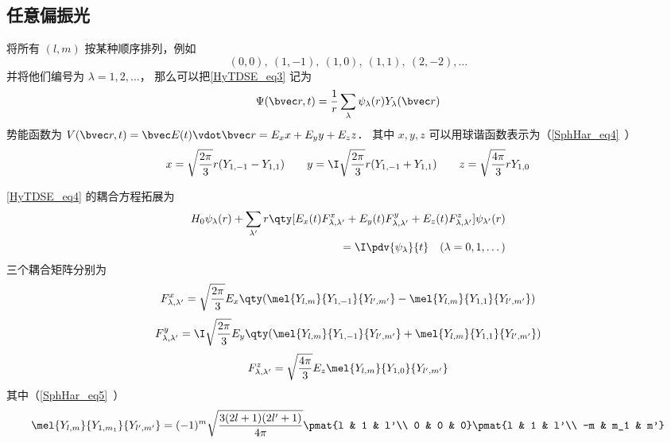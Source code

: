 \subsection{任意偏振光}
将所有 $(l,m)$ 按某种顺序排列，例如
\begin{equation}
(0, 0),\ (1,-1),\ (1,0),\ (1,1),\ (2,-2), \dots
\end{equation}
并将他们编号为 $\lambda = 1,2, \dots$， 那么可以把\autoref{HyTDSE_eq3} 记为
\begin{equation}
\Psi(\bvec r, t) = \frac{1}{r}\sum_\lambda \psi_\lambda(r) Y_\lambda(\bvec r)
\end{equation}
势能函数为 $V(\bvec r, t) = \bvec E(t) \vdot \bvec r  = E_x x + E_y y + E_z z$． 其中 $x,y,z$ 可以用球谐函数表示为（\autoref{SphHar_eq4}~）
\begin{equation}
x = \sqrt{\frac{2\pi}{3}} r (Y_{1,-1} - Y_{1,1}) \qquad
y = \I \sqrt{\frac{2\pi}{3}} r (Y_{1,-1}+Y_{1,1}) \qquad
z = \sqrt{\frac{4\pi}{3}} rY_{1,0}
\end{equation}

\autoref{HyTDSE_eq4} 的耦合方程拓展为
\begin{equation}
\begin{aligned}
H_0 \psi_{\lambda}(r) + \sum_{\lambda'} r \qty[E_x(t) F_{\lambda, \lambda'}^{x} + E_y(t) F_{\lambda, \lambda'}^{y} + E_z(t) F_{\lambda, \lambda'}^{z}] \psi_{\lambda'}(r) \\
= \I \pdv{\psi_{\lambda}}{t} \quad (\lambda=0,1,\dots)
\end{aligned}
\end{equation}
三个耦合矩阵分别为
\begin{equation}
\begin{aligned}
F_{\lambda,\lambda'}^{x} = \sqrt{\frac{2\pi}{3}} E_x \qty(\mel{Y_{l,m}}{Y_{1,-1}}{Y_{l',m'}} - \mel{Y_{l,m}}{Y_{1,1}}{Y_{l',m'}})
\end{aligned}
\end{equation}
\begin{equation}
\begin{aligned}
F_{\lambda,\lambda'}^{y} = \I\sqrt{\frac{2\pi}{3}} E_y \qty(\mel{Y_{l,m}}{Y_{1,-1}}{Y_{l',m'}} + \mel{Y_{l,m}}{Y_{1,1}}{Y_{l',m'}})
\end{aligned}
\end{equation}
\begin{equation}
\begin{aligned}
F_{\lambda,\lambda'}^{z} = \sqrt{\frac{4\pi}{3}} E_z \mel{Y_{l,m}}{Y_{1,0}}{Y_{l',m'}}
\end{aligned}
\end{equation}
其中（\autoref{SphHar_eq5}~）
\begin{equation}
\mel{Y_{l,m}}{Y_{1,m_1}}{Y_{l',m'}} = (-1)^m\sqrt{\frac{3(2l+1)(2l'+1)}{4\pi}} \pmat{l & 1 & l'\\ 0 & 0 & 0}\pmat{l & 1 & l'\\ -m & m_1 & m'}
\end{equation}

